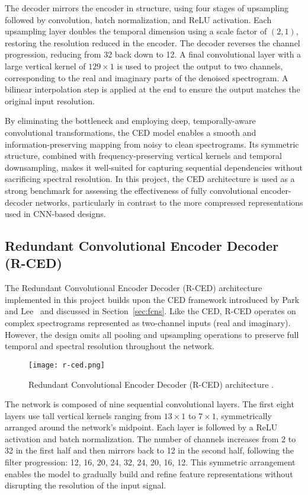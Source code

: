 The decoder mirrors the encoder in structure, using four stages of upsampling followed by convolution, batch normalization, and ReLU activation. Each upsampling layer doubles the temporal dimension using a scale factor of \((2, 1)\), restoring the resolution reduced in the encoder. The decoder reverses the channel progression, reducing from 32 back down to 12. A final convolutional layer with a large vertical kernel of \(129 \times 1\) is used to project the output to two channels, corresponding to the real and imaginary parts of the denoised spectrogram. A bilinear interpolation step is applied at the end to ensure the output matches the original input resolution.

By eliminating the bottleneck and employing deep, temporally-aware convolutional transformations, the CED model enables a smooth and information-preserving mapping from noisy to clean spectrograms. Its symmetric structure, combined with frequency-preserving vertical kernels and temporal downsampling, makes it well-suited for capturing sequential dependencies without sacrificing spectral resolution. In this project, the CED architecture is used as a strong benchmark for assessing the effectiveness of fully convolutional encoder-decoder networks, particularly in contrast to the more compressed representations used in CNN-based designs.

\subsection{Redundant Convolutional Encoder Decoder (R-CED)}
\label{sec:rced}

The Redundant Convolutional Encoder Decoder (R-CED) architecture implemented in this project builds upon the CED framework introduced by Park and Lee~\cite{park2017acoustic} and discussed in Section~\ref{sec:fcns}. Like the CED, R-CED operates on complex spectrograms represented as two-channel inputs (real and imaginary). However, the design omits all pooling and upsampling operations to preserve full temporal and spectral resolution throughout the network.

\begin{figure}[h]
    \centering
    \texttt{[image: r-ced.png]}
    \caption{\label{fig:rced}Redundant Convolutional Encoder Decoder (R-CED) architecture \cite{park2017acoustic}.}
\end{figure}

The network is composed of nine sequential convolutional layers. The first eight layers use tall vertical kernels ranging from \(13 \times 1\) to \(7 \times 1\), symmetrically arranged around the network's midpoint. Each layer is followed by a ReLU activation and batch normalization. The number of channels increases from 2 to 32 in the first half and then mirrors back to 12 in the second half, following the filter progression: 12, 16, 20, 24, 32, 24, 20, 16, 12. This symmetric arrangement enables the model to gradually build and refine feature representations without disrupting the resolution of the input signal.

